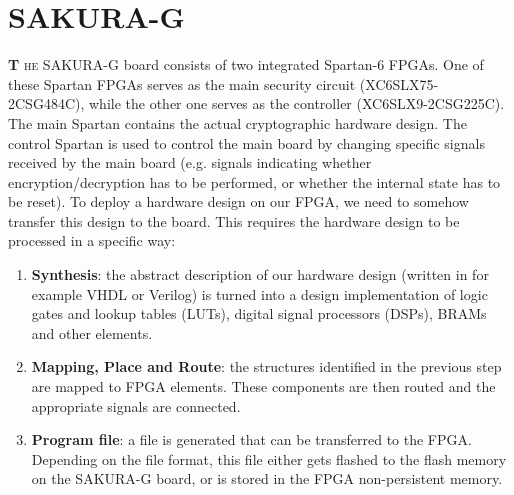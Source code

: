 \chapter{SAKURA-G} \label{chp: SAKURA-G}
\lettrine[lhang = 0.4, findent=-30pt, lines=4]{\textbf{
		\initfamily \fontsize{20mm}{20mm} \selectfont T
		\normalfont}}{he}
SAKURA-G board consists of two integrated Spartan-6 FPGAs.
One of these Spartan FPGAs serves as the main security circuit (XC6SLX75-2CSG484C), while the other one serves as the controller (XC6SLX9-2CSG225C). 
The main Spartan contains the actual cryptographic hardware design.
The control Spartan is used to control the main board by changing specific signals received by the main board (e.g. signals indicating whether encryption/decryption has to be performed, or whether the internal state has to be reset). 
To deploy a hardware design on our FPGA, we need to somehow transfer this design to the board.
This requires the hardware design to be processed in a specific way:
\begin{enumerate}
	\item \textbf{Synthesis}: the abstract description of our hardware design (written in for example VHDL or Verilog) is turned into a design implementation of logic gates and lookup tables (LUTs), digital signal processors (DSPs), BRAMs and other elements.
	
	\item \textbf{Mapping, Place and Route}: the structures identified in the previous step are mapped to FPGA elements.
	These components are then routed and the appropriate signals are connected.
	
	\item \textbf{Program file}: a file is generated that can be transferred to the FPGA. Depending on the file format, this file either gets flashed to the flash memory on the SAKURA-G board, or is stored in the FPGA non-persistent memory.
\end{enumerate}
%

